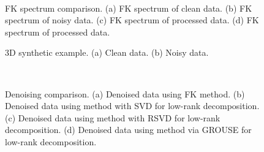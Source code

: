 \begin{figure}[htb!]
  \centering
   \\
   \caption{FK spectrum comparison. (a) FK spectrum of clean data. (b) FK spectrum of noisy data. (c) FK spectrum of  processed data. (d) FK spectrum of  processed data.}
   \label{fig:syn-dnfk}
\end{figure}




\begin{figure}[htb!]
  \centering
   \caption{3D synthetic example. (a) Clean data. (b) Noisy data.}
   \label{fig:syn3d-c,syn3d-n}
\end{figure}

\begin{figure}[htb!]
  \centering
    \\ 
   \caption{Denoising comparison.  (a) Denoised data using FK method. (b) Denoised data using  method with SVD for low-rank decomposition. (c) Denoised data using  method with RSVD for low-rank decomposition. (d) Denoised data using  method via GROUSE for low-rank decomposition.}
   \label{fig:syn3d-fk,syn3d-mssa,syn3d-rsvd,syn3d-mc}
\end{figure}

